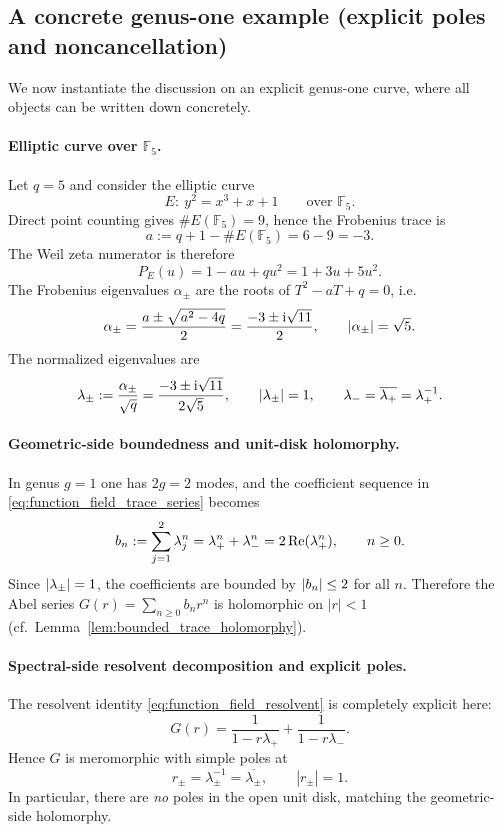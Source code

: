 \subsection{A concrete genus-one example (explicit poles and noncancellation)}
\label{sec:htf_function_field_genus_one}

We now instantiate the discussion on an explicit genus-one curve, where all objects can be written down concretely.

\paragraph{Elliptic curve over \texorpdfstring{$\mathbb{F}_5$}{F5}.}
Let $q=5$ and consider the elliptic curve
\[
E:\ y^2=x^3+x+1
\qquad \text{over }\mathbb{F}_5.
\]
Direct point counting gives $\#E(\mathbb{F}_5)=9$, hence the Frobenius trace is
\[
a:=q+1-\#E(\mathbb{F}_5)=6-9=-3.
\]
The Weil zeta numerator is therefore
\[
P_E(u)=1-a u+q u^2=1+3u+5u^2.
\]
The Frobenius eigenvalues $\alpha_\pm$ are the roots of $T^2-aT+q=0$, i.e.
\[
\alpha_\pm=\frac{a\pm\sqrt{a^2-4q}}{2}
=\frac{-3\pm \mathrm{i}\sqrt{11}}{2},
\qquad
\left\lvert \alpha_\pm\right\rvert=\sqrt{5}.
\]
The normalized eigenvalues are
\begin{equation}
\label{eq:genus_one_lambdas}
\lambda_\pm:=\frac{\alpha_\pm}{\sqrt{q}}=\frac{-3\pm \mathrm{i}\sqrt{11}}{2\sqrt{5}},
\qquad
\left\lvert \lambda_\pm\right\rvert=1,
\qquad
\lambda_-=\overline{\lambda_+}=\lambda_+^{-1}.
\end{equation}

\paragraph{Geometric-side boundedness and unit-disk holomorphy.}
In genus $g=1$ one has $2g=2$ modes, and the coefficient sequence in \eqref{eq:function_field_trace_series} becomes
\[
b_n:=\sum_{j=1}^{2}\lambda_j^n=\lambda_+^n+\lambda_-^n=2\operatorname{Re}(\lambda_+^n),
\qquad n\ge 0.
\]
Since $\left\lvert \lambda_\pm\right\rvert=1$, the coefficients are bounded by $\left\lvert b_n\right\rvert\le 2$ for all $n$.
Therefore the Abel series $G(r)=\sum_{n\ge 0} b_n r^n$ is holomorphic on $|r|<1$ (cf.\ Lemma~\ref{lem:bounded_trace_holomorphy}).

\paragraph{Spectral-side resolvent decomposition and explicit poles.}
The resolvent identity \eqref{eq:function_field_resolvent} is completely explicit here:
\begin{equation}
\label{eq:genus_one_resolvent_explicit}
G(r)=\frac{1}{1-r\lambda_+}+\frac{1}{1-r\lambda_-}.
\end{equation}
Hence $G$ is meromorphic with simple poles at
\[
r_\pm=\lambda_\pm^{-1}=\overline{\lambda_\pm},
\qquad
|r_\pm|=1.
\]
In particular, there are \emph{no} poles in the open unit disk, matching the geometric-side holomorphy.

